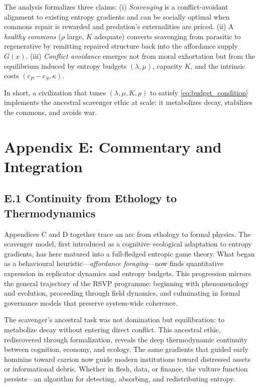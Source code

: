 \documentclass[11pt,a4paper,titlepage]{article}
\theoremstyle{definition}
\begin{document}
The analysis formalizes three claims:
(i) \emph{Scavenging} is a conflict-avoidant alignment to existing entropy gradients and can be socially optimal when commons repair is rewarded and predation’s externalities are priced.
(ii) A \emph{healthy commons} ($\rho$ large, $K$ adequate) converts scavenging from parasitic to regenerative by remitting repaired structure back into the affordance supply $G(x)$.
(iii) \emph{Conflict avoidance} emerges not from moral exhortation but from the equilibrium induced by entropy budgets $(\lambda,\mu)$, capacity $K$, and the intrinsic costs $(c_P-c_S,\kappa)$.

In short, a civilization that tunes $(\lambda,\mu,K,\rho)$ to satisfy \eqref{eq:budget_condition} implements the ancestral scavenger ethic at scale: it metabolizes decay, stabilizes the commons, and avoids war.

\section*{Appendix E: Commentary and Integration}
\label{app:integration}

\subsection*{E.1 Continuity from Ethology to Thermodynamics}

Appendices C and D together trace an arc from ethology to formal physics. 
The scavenger model, first introduced as a cognitive–ecological adaptation to entropy gradients, 
has here matured into a full-fledged entropic game theory.
What began as a behavioural heuristic—\emph{affordance foraging}—now finds quantitative expression 
in replicator dynamics and entropy budgets.  
This progression mirrors the general trajectory of the RSVP programme:
beginning with phenomenology and evolution, proceeding through field dynamics, 
and culminating in formal governance models that preserve system-wide coherence.

The scavenger’s ancestral task was not domination but equilibration: 
to metabolize decay without entering direct conflict.
This ancestral ethic, rediscovered through formalization, 
reveals the deep thermodynamic continuity between cognition, economy, and ecology. 
The same gradients that guided early hominins toward carrion 
now guide modern institutions toward distressed assets or informational debris. 
Whether in flesh, data, or finance, the vulture function persists—an algorithm for 
detecting, absorbing, and redistributing entropy.
\end{document}
